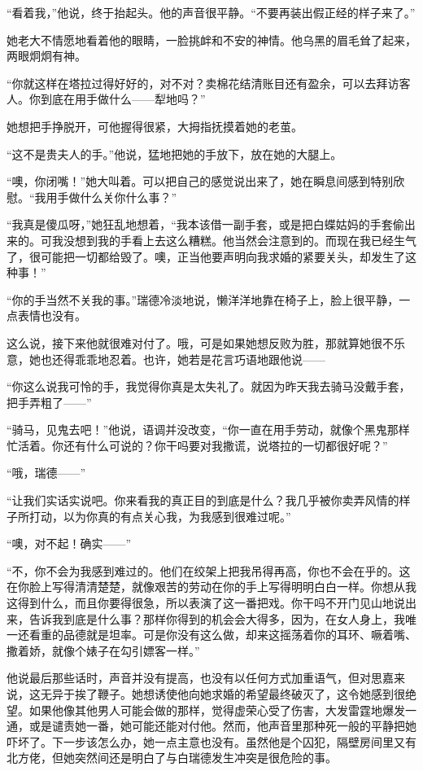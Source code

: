 \par “看着我，”他说，终于抬起头。他的声音很平静。“不要再装出假正经的样子来了。”
\par 她老大不情愿地看着他的眼睛，一脸挑衅和不安的神情。他乌黑的眉毛耸了起来，两眼炯炯有神。
\par “你就这样在塔拉过得好好的，对不对？卖棉花结清账目还有盈余，可以去拜访客人。你到底在用手做什么——犁地吗？”
\par 她想把手挣脱开，可他握得很紧，大拇指抚摸着她的老茧。
\par “这不是贵夫人的手。”他说，猛地把她的手放下，放在她的大腿上。
\par “噢，你闭嘴！”她大叫着。可以把自己的感觉说出来了，她在瞬息间感到特别欣慰。“我用手做什么关你什么事？”
\par “我真是傻瓜呀，”她狂乱地想着，“我本该借一副手套，或是把白蝶姑妈的手套偷出来的。可我没想到我的手看上去这么糟糕。他当然会注意到的。而现在我已经生气了，很可能把一切都给毁了。噢，正当他要声明向我求婚的紧要关头，却发生了这种事！”
\par “你的手当然不关我的事。”瑞德冷淡地说，懒洋洋地靠在椅子上，脸上很平静，一点表情也没有。
\par 这么说，接下来他就很难对付了。哦，可是如果她想反败为胜，那就算她很不乐意，她也还得乖乖地忍着。也许，她若是花言巧语地跟他说——
\par “你这么说我可怜的手，我觉得你真是太失礼了。就因为昨天我去骑马没戴手套，把手弄粗了——”
\par “骑马，见鬼去吧！”他说，语调并没改变，“你一直在用手劳动，就像个黑鬼那样忙活着。你还有什么可说的？你干吗要对我撒谎，说塔拉的一切都很好呢？”
\par “哦，瑞德——”
\par “让我们实话实说吧。你来看我的真正目的到底是什么？我几乎被你卖弄风情的样子所打动，以为你真的有点关心我，为我感到很难过呢。”
\par “噢，对不起！确实——”
\par “不，你不会为我感到难过的。他们在绞架上把我吊得再高，你也不会在乎的。这在你脸上写得清清楚楚，就像艰苦的劳动在你的手上写得明明白白一样。你想从我这得到什么，而且你要得很急，所以表演了这一番把戏。你干吗不开门见山地说出来，告诉我到底是什么事？那样你得到的机会会大得多，因为，在女人身上，我唯一还看重的品德就是坦率。可是你没有这么做，却来这摇荡着你的耳环、噘着嘴、撒着娇，就像个婊子在勾引嫖客一样。”
\par 他说最后那些话时，声音并没有提高，也没有以任何方式加重语气，但对思嘉来说，这无异于挨了鞭子。她想诱使他向她求婚的希望最终破灭了，这令她感到很绝望。如果他像其他男人可能会做的那样，觉得虚荣心受了伤害，大发雷霆地爆发一通，或是谴责她一番，她可能还能对付他。然而，他声音里那种死一般的平静把她吓坏了。下一步该怎么办，她一点主意也没有。虽然他是个囚犯，隔壁房间里又有北方佬，但她突然间还是明白了与白瑞德发生冲突是很危险的事。
